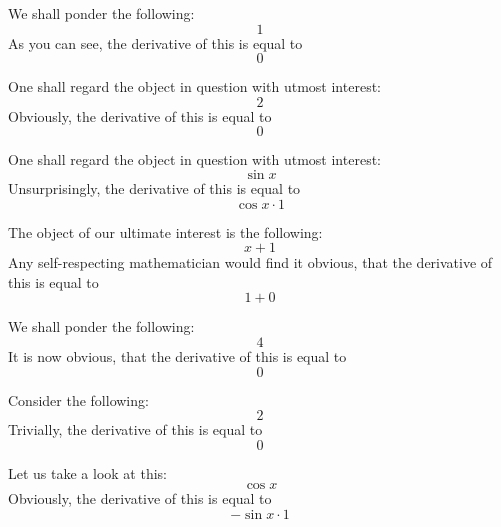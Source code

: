\documentclass{article}
\begin{document}
We shall ponder the following:
\begin{equation}
1 
\end{equation}
As you can see, the derivative of this is equal to
\begin{equation}
0 
\end{equation}

One shall regard the object in question with utmost interest:
\begin{equation}
2 
\end{equation}
Obviously, the derivative of this is equal to
\begin{equation}
0 
\end{equation}

One shall regard the object in question with utmost interest:
\begin{equation}
\sin x 
\end{equation}
Unsurprisingly, the derivative of this is equal to
\begin{equation}
\cos x \cdot 1 
\end{equation}

The object of our ultimate interest is the following:
\begin{equation}
x + 1 
\end{equation}
Any self-respecting mathematician would find it obvious, that the derivative of this is equal to
\begin{equation}
1 + 0 
\end{equation}

We shall ponder the following:
\begin{equation}
4 
\end{equation}
It is now obvious, that the derivative of this is equal to
\begin{equation}
0 
\end{equation}

Consider the following:
\begin{equation}
2 
\end{equation}
Trivially, the derivative of this is equal to
\begin{equation}
0 
\end{equation}

Let us take a look at this:
\begin{equation}
\cos x 
\end{equation}
Obviously, the derivative of this is equal to
\begin{equation}
-\sin x \cdot 1 
\end{equation}
\end{document}
